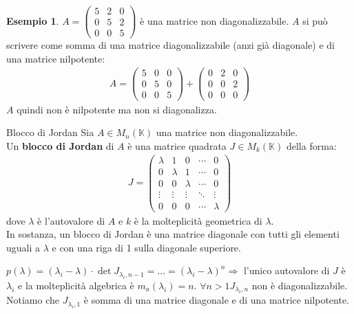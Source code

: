 \documentclass[a4paper]{article}
\theoremstyle{definition}
\newtheorem*{es}{Esempio}
\begin{document}
	\begin{es}
		$A = \begin{pmatrix}
			5 & 2 & 0 \\
			0 & 5 & 2 \\
			0 & 0 & 5
		\end{pmatrix}$ è una matrice non diagonalizzabile.
		$A$ si può scrivere come somma di una matrice diagonalizzabile (anzi già diagonale) e di una matrice nilpotente:
		\begin{align*}
			A = \begin{pmatrix}
				5 & 0 & 0 \\
				0 & 5 & 0 \\
				0 & 0 & 5
			\end{pmatrix} + \begin{pmatrix}
				0 & 2 & 0 \\
				0 & 0 & 2 \\
				0 & 0 & 0
			\end{pmatrix}
		\end{align*}
		$A$ quindi non è nilpotente ma non si diagonalizza.
	\end{es}

	\begin{deff}{Blocco di Jordan}{}
		Sia $A \in M_n(\mathbb{K})$ una matrice non diagonalizzabile. \\
		Un \textbf{blocco di Jordan} di $A$ è una matrice quadrata $J \in M_k(\mathbb{K})$ della forma:
		\begin{align*}
			J = \begin{pmatrix}
				\lambda & 1 & 0 & \cdots & 0 \\
				0 & \lambda & 1 & \cdots & 0 \\
				0 & 0 & \lambda & \cdots & 0 \\
				\vdots & \vdots & \vdots & \ddots & \vdots \\
				0 & 0 & 0 & \cdots & \lambda
			\end{pmatrix}
		\end{align*}
		dove $\lambda$ è l'autovalore di $A$ e $k$ è la molteplicità geometrica di $\lambda$. \\
		In sostanza, un blocco di Jordan è una matrice diagonale con tutti gli elementi uguali a $\lambda$ e con una riga di 1 sulla diagonale superiore.
	\end{deff}
	$p(\lambda) = (\lambda _i - \lambda) \cdot \det J_{\lambda_i,n-1} = ... = (\lambda_i - \lambda)^n \Rightarrow$ l'unico autovalore di $J$ è $\lambda_i$
	e la molteplicità algebrica è $m_a(\lambda_i) = n$.
	$\forall n > 1 J_{\lambda_i,n}$ non è diagonalizzabile. Notiamo che $J_{\lambda_i,1}$ è somma di una matrice diagonale e di una matrice nilpotente.
\end{document}
